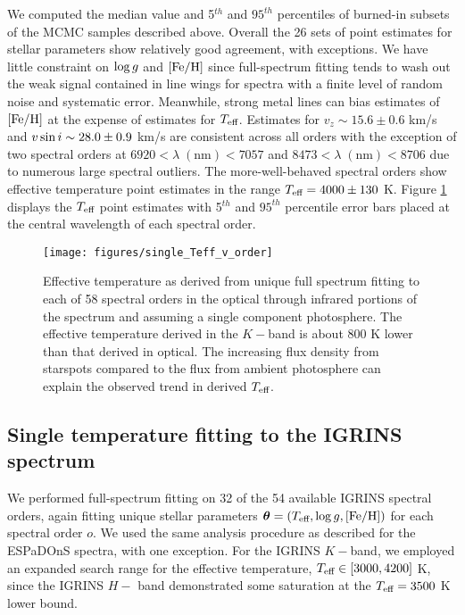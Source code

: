 \documentclass[twocolumn]{emulateapj}%
\begin{document}
We computed the median value and 5$^{th}$ and $95^{th}$ percentiles of burned-in subsets of the MCMC samples described above.  Overall the 26 sets of point estimates for stellar parameters show relatively good agreement, with exceptions.  We have little constraint on $\log g$ and $[{\rm Fe}/{\rm H}]$ since full-spectrum fitting tends to wash out the weak signal contained in line wings for spectra with a finite level of random noise and systematic error.  Meanwhile, strong metal lines can bias estimates of $[{\rm Fe}/{\rm H}]$ at the expense of estimates for $T_\textrm{eff}$.  Estimates for $v_z \sim 15.6 \pm 0.6$ km/s and $v \sin i \sim 28.0 \pm 0.9$ km/s are consistent across all orders with the exception of two spectral orders at $6920 <\lambda \;(\mathrm{nm})< 7057$ and $8473 < \lambda \;(\mathrm{nm}) < 8706$ due to numerous large spectral outliers.  The more-well-behaved spectral orders show effective temperature point estimates in the range $T_\textrm{eff}=4000\pm130$ K.  Figure \ref{fig:SingleTeffvsOrder} displays the $T_\textrm{eff}$ point estimates with 5$^{th}$ and $95^{th}$ percentile error bars placed at the central wavelength of each spectral order.

\begin{figure}
 \centering
 \texttt{[image: figures/single\_Teff\_v\_order]}
 \caption{Effective temperature as derived from unique full spectrum fitting to each of 58 spectral orders in the optical through infrared portions of the spectrum and assuming a single component photosphere.  The effective temperature derived in the $K-$band is about 800 K lower than that derived in optical.  The increasing flux density from starspots compared to the flux from ambient photosphere can explain the observed trend in derived $T_\textrm{eff}$.}
 \label{fig:SingleTeffvsOrder}
\end{figure}

\subsection{Single temperature fitting to the IGRINS spectrum}\label{sec:IGR_starfish}

We performed full-spectrum fitting on 32 of the 54 available IGRINS spectral orders, again fitting unique stellar parameters ${\bm \theta} = (T_\textrm{eff}, \log g, [{\rm Fe}/{\rm H}])$ for each spectral order $o$.  We used the same analysis procedure as described for the ESPaDOnS spectra, with one exception.  For the IGRINS $K-$band, we employed an expanded search range for the effective temperature, $T_\textrm{eff} \in [3000, 4200]$ K, since the IGRINS $H-$ band demonstrated some saturation at the $T_\textrm{eff}=3500$ K lower bound.  
\end{document}
